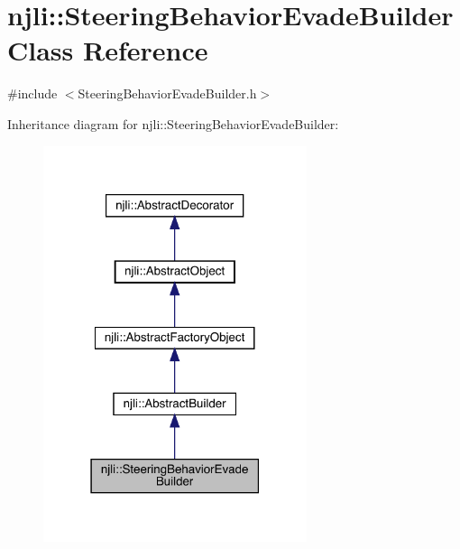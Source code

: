 \hypertarget{classnjli_1_1_steering_behavior_evade_builder}{}\section{njli\+:\+:Steering\+Behavior\+Evade\+Builder Class Reference}
\label{classnjli_1_1_steering_behavior_evade_builder}


{\ttfamily \#include $<$Steering\+Behavior\+Evade\+Builder.\+h$>$}



Inheritance diagram for njli\+:\+:Steering\+Behavior\+Evade\+Builder\+:\nopagebreak
\begin{figure}[H]
\begin{center}
\leavevmode
\includegraphics[width=219pt]{classnjli_1_1_steering_behavior_evade_builder__inherit__graph}
\end{center}
\end{figure}


